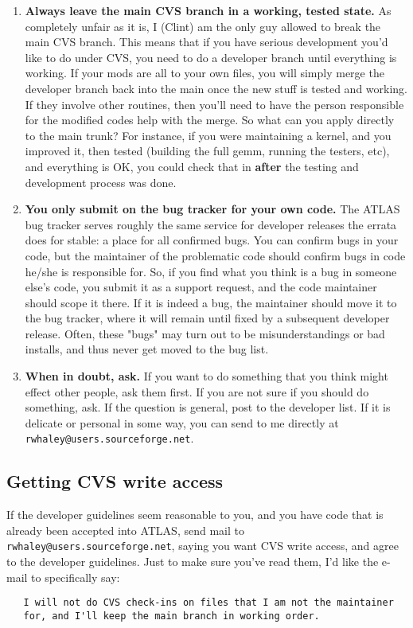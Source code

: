 \documentclass[11pt]{article}
\begin{document}
{\begin{enumerate}
\item {\bf Always leave the main CVS branch in a working, tested state.}
As completely unfair as it is, I (Clint) am the only guy allowed to break
the main CVS branch.  This means that if you have serious development you'd
like to do under CVS, you need to do a developer branch until everything is
working.  If your mods are all to your own files, you will simply merge the
developer branch back into the main once the new stuff is tested and working.
If they involve other routines, then you'll need to have the person
responsible for the modified codes help with the merge.  So what can you
apply directly to the main trunk?  For instance, if you were maintaining
a kernel, and you improved it, then tested (building the full gemm,
running the testers, etc), and everything is OK, you could
check that in {\bf after} the testing and development process was done.

\item{\bf You only submit on the bug tracker for your own code.}
The ATLAS bug tracker serves roughly the same service for developer
releases the errata does for stable: a place for all confirmed bugs.
You can confirm bugs in your code, but the maintainer of the problematic
code should confirm bugs in code he/she is responsible for.  So, if
you find what you think is a bug in someone else's code, you submit it as a
support request, and the code maintainer should scope it there.  If it is
indeed a bug, the maintainer should move it to the bug tracker, where it
will remain until fixed by a subsequent developer release.  Often, these
"bugs" may turn out to be misunderstandings or bad installs, and thus never
get moved to the bug list.

\item{\bf When in doubt, ask.} If you want to do something that you think
might effect other people, ask them first.  If you are not sure if you should
do something, ask.  If the question is general, post to the developer list.
If it is delicate or personal in some way, you can send to me directly at
{\tt rwhaley@users.sourceforge.net}.
\end{enumerate}

\subsection{Getting CVS write access}
If the developer guidelines seem reasonable to you, and you have code that
is already been accepted into ATLAS, send mail to
{\tt rwhaley@users.sourceforge.net}, saying you want CVS write access, and
agree to the developer guidelines.  Just to make sure you've read them,
I'd like the e-mail to specifically say:
\begin{verbatim}
   I will not do CVS check-ins on files that I am not the maintainer
   for, and I'll keep the main branch in working order.
\end{verbatim}

}
\end{document}
